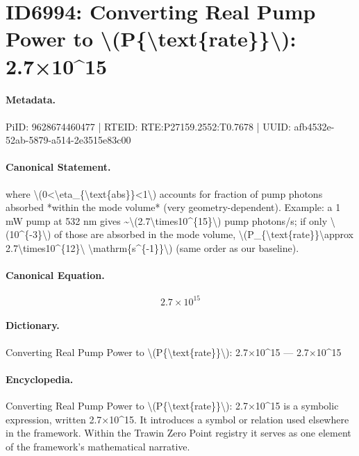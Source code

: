 \section*{ID6994: Converting Real Pump Power to \textbackslash{}(P\{\textbackslash{}text\{rate\}\}\textbackslash{}): 2.7×10\textasciicircum{}15}
\paragraph{Metadata.}
PiID: 9628674460477 | RTEID: RTE:P27159.2552:T0.7678 | UUID: afb4532e-52ab-5879-a514-2e3515e83c00

\paragraph{Canonical Statement.}
where \textbackslash{}(0<\textbackslash{}eta\_\{\textbackslash{}text\{abs\}\}<1\textbackslash{}) accounts for fraction of pump photons absorbed *within the mode volume* (very geometry-dependent). Example: a 1 mW pump at 532 nm gives \textasciitilde{}\textbackslash{}(2.7\textbackslash{}times10\textasciicircum{}\{15\}\textbackslash{}) pump photons/s; if only \textbackslash{}(10\textasciicircum{}\{-3\}\textbackslash{}) of those are absorbed in the mode volume, \textbackslash{}(P\_\{\textbackslash{}text\{rate\}\}\textbackslash{}approx 2.7\textbackslash{}times10\textasciicircum{}\{12\}\textbackslash{} \textbackslash{}mathrm\{s\textasciicircum{}\{-1\}\}\textbackslash{}) (same order as our baseline).

\paragraph{Canonical Equation.}
\[
2.7\times10^{15}
\]

\paragraph{Dictionary.}
Converting Real Pump Power to \textbackslash{}(P\{\textbackslash{}text\{rate\}\}\textbackslash{}): 2.7×10\textasciicircum{}15 — 2.7×10\textasciicircum{}15

\paragraph{Encyclopedia.}
Converting Real Pump Power to \textbackslash{}(P\{\textbackslash{}text\{rate\}\}\textbackslash{}): 2.7×10\textasciicircum{}15 is a symbolic expression, written 2.7×10\textasciicircum{}15. It introduces a symbol or relation used elsewhere in the framework. Within the Trawin Zero Point registry it serves as one element of the framework's mathematical narrative.
